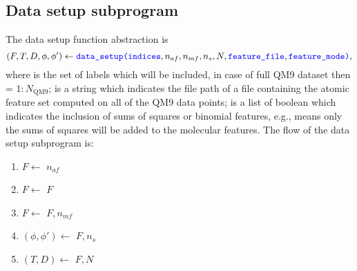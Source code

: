 \documentclass[12pt]{article}
\begin{document}
\subsection{Data setup subprogram}
\label{sub:data}
The data setup function abstraction is
\begin{equation*}
	(F, T, D, \phi, \phi') \leftarrow \codeword{data_setup(indices}, n_{af}, n_{mf}, n_s, N, \codeword{feature_file}, \codeword{feature_mode)},
\end{equation*}
where  is the set of labels which will be included, in case of full QM9 dataset then  = $1:N_\text{QM9}$;  is a string which indicates the file path of a file containing the atomic feature set computed on all of the QM9 data points;  is a list of boolean which indicates the inclusion of sums of squares or binomial features, e.g.,  means only the sums of squares will be added to the molecular features. The flow of the data setup subprogram is:
\begin{enumerate}
	\item $F \leftarrow$  $n_{af}$\codeword{)}
	\item $F \leftarrow$ $F$
	\item $F \leftarrow$ $F, n_{mf}$\codeword{)}
	\item $(\phi, \phi') \leftarrow$ $F, n_s$\codeword{)} 
	\item $(T, D) \leftarrow$ $F, N$\codeword{)}
\end{enumerate}
\end{document}
